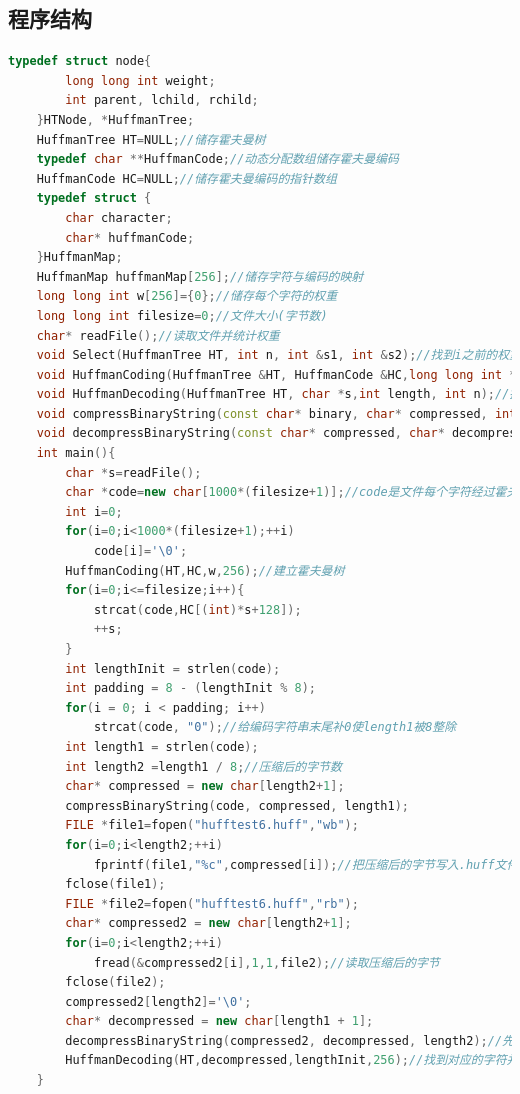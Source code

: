 \documentclass{ctexart}
\begin{document}
	\subsection{程序结构}
	\begin{lstlisting}[language=C++, caption=程序结构]
	typedef struct node{
		long long int weight;
		int parent, lchild, rchild;
	}HTNode, *HuffmanTree;
	HuffmanTree HT=NULL;//储存霍夫曼树
	typedef char **HuffmanCode;//动态分配数组储存霍夫曼编码
	HuffmanCode HC=NULL;//储存霍夫曼编码的指针数组
	typedef struct {
		char character;
		char* huffmanCode;
	}HuffmanMap;
	HuffmanMap huffmanMap[256];//储存字符与编码的映射
	long long int w[256]={0};//储存每个字符的权重
	long long int filesize=0;//文件大小(字节数)
	char* readFile();//读取文件并统计权重
	void Select(HuffmanTree HT, int n, int &s1, int &s2);//找到i之前的权重最小且双亲为0的两个权重
	void HuffmanCoding(HuffmanTree &HT, HuffmanCode &HC,long long int *w, int n);//建立霍夫曼树
	void HuffmanDecoding(HuffmanTree HT, char *s,int length, int n);//把编码后的01字符串解码为原字符串
	void compressBinaryString(const char* binary, char* compressed, int length);//通过位运算把长为八个字节的01字符串压缩为一个字节（8位）
	void decompressBinaryString(const char* compressed, char* decompressed, int length);//通过位运算把一个字节（8位）还原长为八个字节的01字符串
	int main(){
		char *s=readFile();
		char *code=new char[1000*(filesize+1)];//code是文件每个字符经过霍夫曼树处理后的编码字符串
		int i=0;
		for(i=0;i<1000*(filesize+1);++i)
			code[i]='\0';
		HuffmanCoding(HT,HC,w,256);//建立霍夫曼树
		for(i=0;i<=filesize;i++){
			strcat(code,HC[(int)*s+128]);
			++s;
		}
		int lengthInit = strlen(code);
		int padding = 8 - (lengthInit % 8);
		for(i = 0; i < padding; i++) 
			strcat(code, "0");//给编码字符串末尾补0使length1被8整除
		int length1 = strlen(code);
		int length2 =length1 / 8;//压缩后的字节数
		char* compressed = new char[length2+1];
		compressBinaryString(code, compressed, length1);
		FILE *file1=fopen("hufftest6.huff","wb");
		for(i=0;i<length2;++i)
			fprintf(file1,"%c",compressed[i]);//把压缩后的字节写入.huff文件
		fclose(file1);
		FILE *file2=fopen("hufftest6.huff","rb");
		char* compressed2 = new char[length2+1];
		for(i=0;i<length2;++i)
			fread(&compressed2[i],1,1,file2);//读取压缩后的字节
		fclose(file2);
		compressed2[length2]='\0';
		char* decompressed = new char[length1 + 1];
		decompressBinaryString(compressed2, decompressed, length2);//先解压缩为01字符串
		HuffmanDecoding(HT,decompressed,lengthInit,256);//找到对应的字符并写入新文件
	}
\end{lstlisting}
\end{document}
